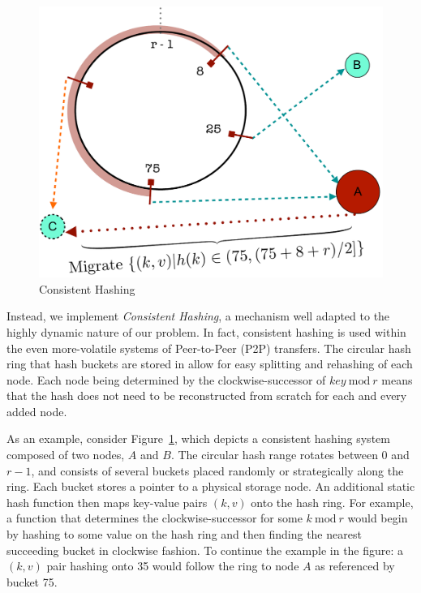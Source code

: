 \begin{figure}
\begin{center}
\includegraphics[scale=0.5]{figures/hashing.pdf}
\end{center}
\caption{Consistent Hashing}
\label{fig:hashing}
\end{figure}

Instead, we implement \emph{Consistent Hashing}\cite{karger1}, a mechanism well
adapted to the highly dynamic nature of our problem. In fact, consistent
hashing is used within the even more-volatile systems of Peer-to-Peer (P2P)
transfers. The circular hash ring that hash buckets are stored in allow for
easy splitting and rehashing of each node. Each node being determined by the
clockwise-successor of $key\ \textrm{mod}\ r$ means that the hash does not need to be
reconstructed from scratch for each and every added node.

As an example, consider Figure~\ref{fig:hashing}, which depicts a consistent
hashing system composed of two nodes, $A$ and $B$. The circular hash range
rotates between $0$ and $r-1$, and consists of several buckets placed randomly
or strategically along the ring. Each bucket stores a pointer to a physical
storage node. An additional static hash function then maps key-value pairs
$(k,v)$ onto the hash ring. For example, a function that determines the
clockwise-successor for some $k\ \textrm{mod}\ r$ would begin by hashing to some
value on the hash ring and then finding the nearest succeeding bucket in
clockwise fashion. To continue the example in the figure: a $(k,v)$ pair
hashing onto 35 would follow the ring to node $A$ as referenced by bucket 75.

